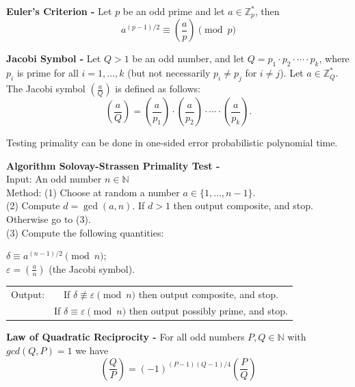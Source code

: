 \documentclass[a4paper]{article}
\begin{document}
\begin{theorem}
\textbf{Euler's Criterion -} Let $p$ be an odd prime and let $a \in \mathbb{Z}_{p}^{*}$, then
$$a^{(p - 1) / 2} \equiv \left( \frac{a}{p} \right) \pmod{p}$$
\end{theorem}


\begin{definition}
\textbf{Jacobi Symbol -} Let $Q > 1$ be an odd number, and let $Q = p_{1} \cdot p_{2} \cdot \cdots \cdot p_{k}$, where $p_{i}$ is prime for all $i = 1, \ldots, k$ (but not necessarily $p_{i} \neq p_{j}$ for $i \neq j$). Let $a \in \mathbb{Z}_{Q}^{*}$. The Jacobi symbol $\left( \frac{a}{Q} \right)$ is defined as follows:
$$\left( \frac{a}{Q} \right) = \left( \frac{a}{p_{1}} \right) \cdot \left( \frac{a}{p_{2}} \right) \cdot \cdots \cdot \left( \frac{a}{p_{k}} \right).$$
\end{definition}


\begin{theorem}
Testing primality can be done in one-sided error probabilistic polynomial time.
\end{theorem}


\begin{algorithm}
\textbf{Algorithm Solovay-Strassen Primality Test -} \\
Input: An odd number $n \in \mathbb{N}$ \\
Method: (1) Choose at random a number $a \in \{1, \ldots, n - 1 \}$. \\
(2) Compute $d = \gcd(a, n)$. If $d > 1$ then output composite, and stop. Otherwise go to (3). \\
(3) Compute the following quantities:
\begin{center}
$\delta \equiv a^{(n - 1)/2} \pmod{n}$; \\
$\varepsilon = \left( \frac{a}{n} \right)$ (the Jacobi symbol).
\end{center}
\begin{tabular}{c c}
Output: & If $\delta \not\equiv \varepsilon \pmod{n}$ then output composite, and stop. \\
& If $\delta \equiv \varepsilon \pmod{n}$ then output possibly prime, and stop.
\end{tabular}
\end{algorithm}


\begin{theorem}
\textbf{Law of Quadratic Reciprocity -} For all odd numbers $P, Q \in \mathbb{N}$ with $gcd(Q, P) = 1$ we have
$$\left( \frac{Q}{P} \right) = (-1)^{(P - 1)(Q - 1)/4} \left( \frac{P}{Q} \right)$$
\end{theorem}
\end{document}
